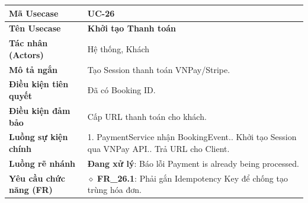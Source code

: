 \begin{table}[H]
\renewcommand{\arraystretch}{1.3}
\centering
\begin{tabularx}{\textwidth}{|p{4.5cm}|X|}
\hline
\cellcolor{gray!15}\bfseries Mã Usecase & \textbf{UC-26} \\ \hline
\cellcolor{gray!15}\bfseries Tên Usecase & \textbf{Khởi tạo Thanh toán} \\ \hline
\cellcolor{gray!15}\bfseries Tác nhân (Actors) & Hệ thống, Khách \\ \hline
\cellcolor{gray!15}\bfseries Mô tả ngắn & Tạo Session thanh toán VNPay/Stripe. \\ \hline
\cellcolor{gray!15}\bfseries Điều kiện tiên quyết & Đã có Booking ID. \\ \hline
\cellcolor{gray!15}\bfseries Điều kiện đảm bảo & Cấp URL thanh toán cho khách. \\ \hline
\cellcolor{gray!15}\bfseries Luồng sự kiện chính & 1. PaymentService nhận BookingEvent.\newline 2. Khởi tạo Session qua VNPay API.\newline 3. Trả URL cho Client. \\ \hline
\cellcolor{gray!15}\bfseries Luồng rẽ nhánh & \textbf{Đang xử lý}: Báo lỗi Payment is already being processed. \\ \hline
\cellcolor{gray!15}\bfseries Yêu cầu chức năng (FR) & $\diamond$ \textbf{FR\_26.1}: Phải gắn Idempotency Key để chống tạo trùng hóa đơn. \\ \hline
\end{tabularx}
\end{table}

